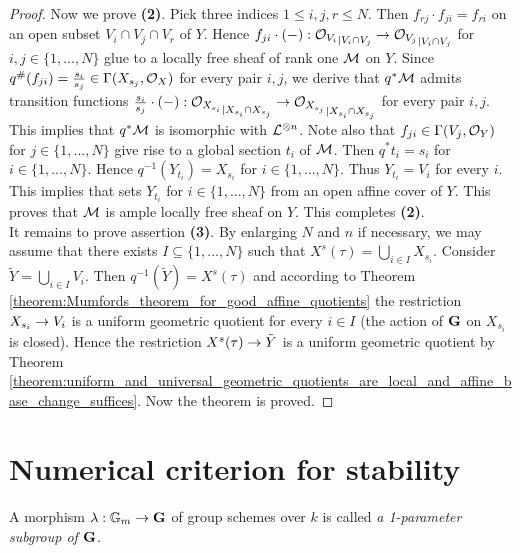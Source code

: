 \begin{proof}
Now we prove \textbf{(2)}. Pick three indices $1\leq i,j,r\leq N$. Then $f_{rj}\cdot f_{ji} = f_{ri}$ on an open subset $V_i\cap V_j\cap V_r$ of $Y$. Hence $f_{ji}\cdot (-):{{\mathcal O}_{V_i}}_{\mid V_i\cap V_j} \rightarrow {{\mathcal O}_{V_j}}_{\mid V_i\cap V_j}$ for $i,j \in \{1,...,N\}$ glue to a locally free sheaf of rank one ${\mathcal M}$ on $Y$. Since $q^{\#}(f_{ji}) = \frac{s_i}{s_j}\in \Gamma(X_{s_j},{\mathcal O}_X)$ for every pair $i,j$, we derive that $q^*{\mathcal M}$ admits transition functions $\frac{s_i}{s_j}\cdot (-):{{\mathcal O}_{X_{s_i}}}_{\mid X_{s_i}\cap X_{s_j}} \rightarrow {{\mathcal O}_{X_{s_j}}}_{\mid X_{s_i}\cap X_{s_j}}$ for every pair $i,j$. This implies that $q^*{\mathcal M}$ is isomorphic with ${\mathcal L}^{\otimes n}$. Note also that $f_{ji}\in \Gamma(V_j,{\mathcal O}_Y)$ for $j\in \{1,...,N\}$ give rise to a global section $t_i$ of ${\mathcal M}$. Then $q^*t_i = s_i$ for $i\in \{1,...,N\}$. Hence $q^{-1}\left(Y_{t_i}\right) = X_{s_i}$ for $i\in \{1,...,N\}$. Thus $Y_{t_i} = V_i$ for every $i$. This implies that sets $Y_{t_i}$ for $i\in \{1,...,N\}$ from an open affine cover of $Y$. This proves that ${\mathcal M}$ is ample locally free sheaf on $Y$. This completes \textbf{(2)}.\\
It remains to prove assertion \textbf{(3)}. By enlarging $N$ and $n$ if necessary, we may assume that there exists $I\subseteq \{1,...,N\}$ such that $X^s(\tau) = \bigcup_{i\in I}X_{s_i}$. Consider $\tilde{Y} = \bigcup_{i\in I}V_i$. Then $q^{-1}(\tilde{Y}) = X^s(\tau)$ and according to Theorem \ref{theorem:Mumfords_theorem_for_good_affine_quotients} the restriction $X_{s_i}\rightarrow V_i$ is a uniform geometric quotient for every $i\in I$ (the action of $\mathbf{G}$ on $X_{s_i}$ is closed). Hence the restriction $X^s(\tau)\rightarrow \tilde{Y}$ is a uniform geometric quotient by Theorem \ref{theorem:uniform_and_universal_geometric_quotients_are_local_and_affine_base_change_suffices}. Now the theorem is proved.
\end{proof}

\section{Numerical criterion for stability}

\begin{definition}
A morphism $\lambda:\mathbb{G}_m\rightarrow \mathbf{G}$ of group schemes over $k$ is called \textit{a 1-parameter subgroup of $\mathbf{G}$}.
\end{definition}









\small



    

